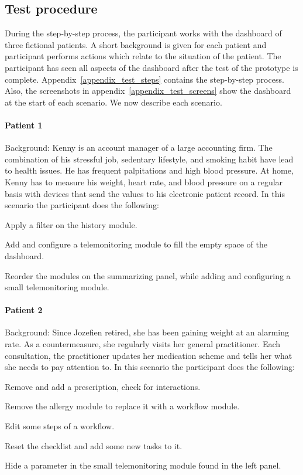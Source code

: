     \subsection{Test procedure}

    During the step-by-step process, the participant works with the dashboard of three fictional patients. A short background is given for each patient and participant performs actions which relate to the situation of the patient. The participant has seen all aspects of the dashboard after the test of the prototype is complete. Appendix~\ref{appendix_test_steps} contains the step-by-step process. Also, the screenshots in appendix~\ref{appendix_test_screens} show the dashboard at the start of each scenario. We now describe each scenario.

    \paragraph{Patient 1} Background: Kenny is an account manager of a large accounting firm. The combination of his stressful job, sedentary lifestyle, and smoking habit have lead to health issues. He has frequent palpitations and high blood pressure. At home, Kenny has to measure his weight, heart rate, and blood pressure on a regular basis with devices that send the values to his electronic patient record. In this scenario the participant does the following:
    \vspace{-6pt}
    \begin{myenumerate}
        \item Apply a filter on the history module.
        \item Add and configure a telemonitoring module to fill the empty space of the dashboard.
        \item Reorder the modules on the summarizing panel, while adding and configuring a small telemonitoring module.
    \end{myenumerate}

    \paragraph{Patient 2} Background: Since Jozefien retired, she has been gaining weight at an alarming rate. As a countermeasure, she regularly visits her general practitioner. Each consultation, the practitioner updates her medication scheme and tells her what she needs to pay attention to. In this scenario the participant does the following:
    \vspace{-6pt}
    \begin{myenumerate}
        \item Remove and add a prescription, check for interactions.
        \item Remove the allergy module to replace it with a workflow module.
        \item Edit some steps of a workflow.
        \item Reset the checklist and add some new tasks to it.
        \item Hide a parameter in the small telemonitoring module found in the left panel.
    \end{myenumerate}

